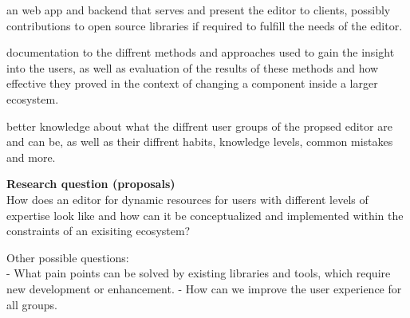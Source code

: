 \begin{description}[leftmargin=10em,style=nextline]
  \item[software] an web app and backend that serves and present the editor to clients, possibly contributions to open source libraries if required to fulfill the needs of the editor.
  \item[HCI discoveries] documentation to the diffrent methods and approaches used to gain the insight into the users,
  as well as evaluation of the results of these methods and how effective they proved in the context of changing a component inside a larger ecosystem.
  \item[user base knowledge] better knowledge about what the diffrent user groups of the propsed editor are and can be, as well as their diffrent habits, knowledge levels, common mistakes and more.
\end{description}

\textbf{Research question (proposals)}\vspace{2mm}\\

How does an editor for dynamic resources for users with different levels of expertise look like and how can it be conceptualized and implemented within the constraints of an exisiting ecosystem?


Other possible questions: \\
- What pain points can be solved by existing libraries and tools, which require new development or enhancement.
- How can we improve the user experience for all groups.
